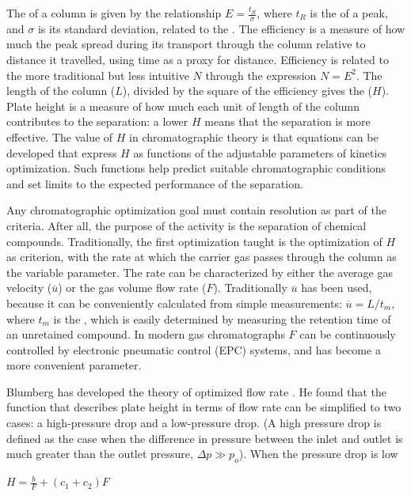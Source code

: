 The  of a column is given by the relationship \(E =
\frac{t_R}{\sigma} \), where \(t_R\) is the  of a peak,
and \(\sigma\) is its standard deviation, related to the 
\autocite{Blumberg2018}. The efficiency is a measure of how much the peak spread
during its transport through the column relative to distance it travelled, using
time as a proxy for distance. Efficiency is related to the more traditional but
less intuitive  \(N\) through the expression \(N =
E^2\). The length of the column (\(L\)), divided by the square of the efficiency
gives the  (\(H\)). Plate height is a measure of how much
each unit of length of the column contributes to the separation: a lower \(H\)
means that the separation is more effective. The value of \(H\) in chromatographic
theory is that equations can be developed that express \(H\) as functions of the
adjustable parameters of kinetics optimization. Such functions help predict
suitable chromatographic conditions and set limits to the expected performance
of the separation.

Any chromatographic optimization goal must contain resolution as part of the
criteria. After all, the purpose of the activity is the separation of chemical
compounds. Traditionally, the first optimization taught is the optimization of
\(H\) as criterion, with the rate at which the carrier gas passes through the
column as the variable parameter. The rate can be characterized by either the
average gas velocity (\(\overline{u}\)) or the gas volume flow rate (\(F\)).
Traditionally \(\overline{u}\) has been used, because it can be conveniently
calculated from simple measurements: \(\overline{u} = L/t_m\), where \(t_m\) is
the , which is easily determined by measuring the retention
time of an unretained compound. In modern gas chromatographs \(F\) can be
continuously controlled by electronic pneumatic control (EPC) systems, and has
become a more convenient parameter.

Blumberg has developed the theory of optimized flow rate
\autocite{Blumberg1999}. He found that the function that describes plate height
in terms of flow rate can be simplified to two cases: a high-pressure drop and a
low-pressure drop. (A high pressure drop is defined as the case when the
difference in pressure between the inlet and outlet is much greater than the
outlet pressure, \(\Delta{p} \gg p_o\)). When the pressure drop is low

\(H = \frac{\displaystyle b}{\displaystyle F}+(c_1+c_2)F \)

